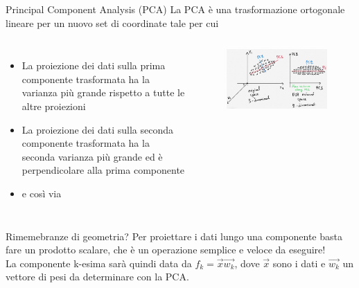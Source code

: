 \documentclass[
10pt,
aspectratio=169,
]{beamer}
\begin{document}
\begin{frame}{Principal Component Analysis (PCA)}
    La PCA è una trasformazione ortogonale lineare per un nuovo set di coordinate  tale per cui
    \begin{columns}
    \begin{itemize}
        \item La proiezione dei dati sulla prima componente trasformata ha la varianza più grande rispetto a tutte le altre proiezioni
        \item La proiezione dei dati sulla seconda componente trasformata ha la seconda varianza più grande ed è perpendicolare alla prima componente
        \item e così via
    \end{itemize}
    \begin{figure}
        \centering
        \includegraphics[width=\textwidth]{figures/pca.jpg}
    \end{figure}
\end{columns}
\vfill
Rimemebranze di geometria? Per proiettare i dati lungo una componente basta fare un prodotto scalare, che è un operazione semplice e veloce da eseguire!\\
La componente k-esima sarà quindi data da  $f_k = \vec{x}\vec{w_k}$, dove $\vec{x}$ sono i  dati e $\vec{w_k}$ un vettore di pesi da determinare con la PCA.
\end{frame}
\end{document}
